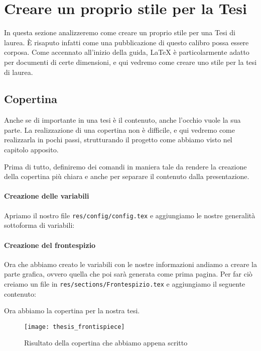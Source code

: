\section{Creare un proprio stile per la Tesi}
In questa sezione analizzeremo come creare un proprio stile per una Tesi di
laurea. È risaputo infatti come una pubblicazione di questo calibro possa
essere corposa. Come accennato all'inizio della guida, \LaTeX{} è
particolarmente adatto per documenti di certe dimensioni, e qui vedremo come
creare uno stile per la tesi di laurea.

\subsection{Copertina}
Anche se di importante in una tesi è il contenuto, anche l'occhio vuole la sua
parte. La realizzazione di una copertina non è difficile, e qui vedremo come
realizzarla in pochi passi, strutturando il progetto come abbiamo visto nel
capitolo apposito. %

Prima di tutto, definiremo dei comandi in maniera tale da rendere la creazione
della copertina più chiara e anche per separare il contenuto dalla
presentazione.

\paragraph*{Creazione delle variabili} Apriamo il nostro file
\texttt{res/config/config.tex} e aggiungiamo le nostre generalità sottoforma di
variabili:



\paragraph*{Creazione del frontespizio} Ora che abbiamo creato le variabili con
le nostre informazioni andiamo a creare la parte grafica, ovvero quella che poi
sarà generata come prima pagina. Per far ciò creiamo un file in
\texttt{res/sections/Frontespizio.tex} e aggiungiamo il seguente contenuto:



\noindent Ora abbiamo la copertina per la nostra tesi.

\begin{figure}[t]
 \centering
 \texttt{[image: thesis\_frontispiece]}
 \caption[Frontespizio tesi]{Risultato della copertina che abbiamo appena
scritto}
 \label{img:thesis_frontispiece}
\end{figure}


